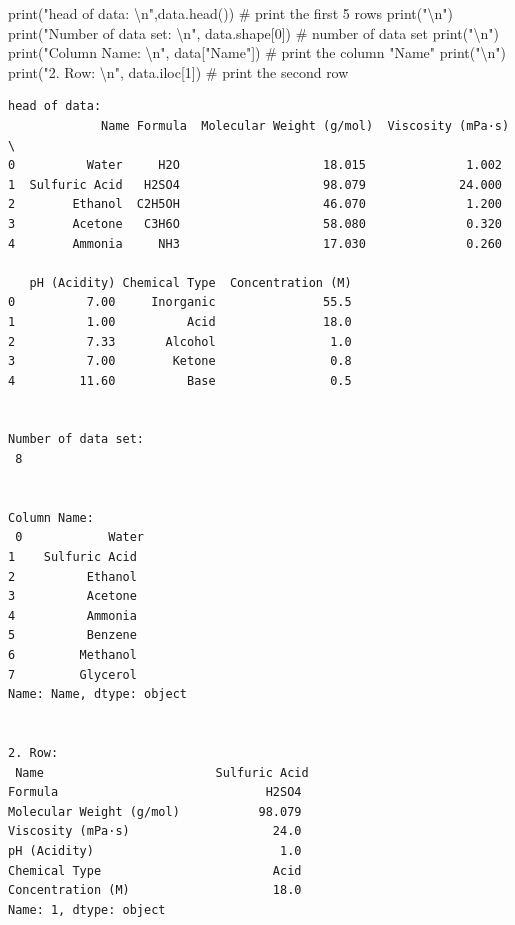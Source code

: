 \documentclass[
  letterpaper,
  DIV=11,
  numbers=noendperiod]{scrreprt}
\newenvironment{Shaded}{\begin{snugshade}}{\end{snugshade}}
\newcommand{\BuiltInTok}[1]{\textcolor[rgb]{0.00,0.23,0.31}{#1}}
\newcommand{\CharTok}[1]{\textcolor[rgb]{0.13,0.47,0.30}{#1}}
\newcommand{\CommentTok}[1]{\textcolor[rgb]{0.37,0.37,0.37}{#1}}
\newcommand{\DecValTok}[1]{\textcolor[rgb]{0.68,0.00,0.00}{#1}}
\newcommand{\NormalTok}[1]{\textcolor[rgb]{0.00,0.23,0.31}{#1}}
\newcommand{\StringTok}[1]{\textcolor[rgb]{0.13,0.47,0.30}{#1}}
\begin{document}
\begin{Shaded}
\begin{Highlighting}[]
\BuiltInTok{print}\NormalTok{(}\StringTok{"head of data: }\CharTok{\textbackslash{}n}\StringTok{"}\NormalTok{,data.head()) }\CommentTok{\# print the first 5 rows}
\BuiltInTok{print}\NormalTok{(}\StringTok{"}\CharTok{\textbackslash{}n}\StringTok{"}\NormalTok{)}
\BuiltInTok{print}\NormalTok{(}\StringTok{"Number of data set: }\CharTok{\textbackslash{}n}\StringTok{"}\NormalTok{, data.shape[}\DecValTok{0}\NormalTok{]) }\CommentTok{\# number of data set}
\BuiltInTok{print}\NormalTok{(}\StringTok{"}\CharTok{\textbackslash{}n}\StringTok{"}\NormalTok{)}
\BuiltInTok{print}\NormalTok{(}\StringTok{"Column Name: }\CharTok{\textbackslash{}n}\StringTok{"}\NormalTok{, data[}\StringTok{"Name"}\NormalTok{]) }\CommentTok{\# print the column "Name"}
\BuiltInTok{print}\NormalTok{(}\StringTok{"}\CharTok{\textbackslash{}n}\StringTok{"}\NormalTok{)}
\BuiltInTok{print}\NormalTok{(}\StringTok{"2. Row: }\CharTok{\textbackslash{}n}\StringTok{"}\NormalTok{, data.iloc[}\DecValTok{1}\NormalTok{]) }\CommentTok{\# print the second row}
\end{Highlighting}
\end{Shaded}

\begin{verbatim}
head of data: 
             Name Formula  Molecular Weight (g/mol)  Viscosity (mPa·s)  \
0          Water     H2O                    18.015              1.002   
1  Sulfuric Acid   H2SO4                    98.079             24.000   
2        Ethanol  C2H5OH                    46.070              1.200   
3        Acetone   C3H6O                    58.080              0.320   
4        Ammonia     NH3                    17.030              0.260   

   pH (Acidity) Chemical Type  Concentration (M)  
0          7.00     Inorganic               55.5  
1          1.00          Acid               18.0  
2          7.33       Alcohol                1.0  
3          7.00        Ketone                0.8  
4         11.60          Base                0.5  


Number of data set: 
 8


Column Name: 
 0            Water
1    Sulfuric Acid
2          Ethanol
3          Acetone
4          Ammonia
5          Benzene
6         Methanol
7         Glycerol
Name: Name, dtype: object


2. Row: 
 Name                        Sulfuric Acid
Formula                             H2SO4
Molecular Weight (g/mol)           98.079
Viscosity (mPa·s)                    24.0
pH (Acidity)                          1.0
Chemical Type                        Acid
Concentration (M)                    18.0
Name: 1, dtype: object
\end{verbatim}
\end{document}
